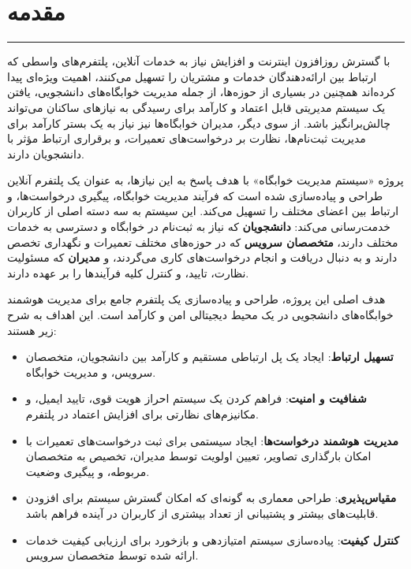 \documentclass[12pt,a4paper]{report}
\begin{document}
	
	
	
	\tableofcontents
	\newpage
	
	\listoffigures
	\newpage
	
	
	
	\chapter{مقدمه}
	\vspace{-2.5\baselineskip}
	\noindent\rule{\textwidth}{0.4pt}
	
	
	\hspace{-0.1cm} 
	با گسترش روزافزون اینترنت و افزایش نیاز به خدمات آنلاین، پلتفرم‌های واسطی که ارتباط بین ارائه‌دهندگان خدمات و مشتریان را تسهیل می‌کنند، اهمیت ویژه‌ای پیدا کرده‌اند همچنین در بسیاری از حوزه‌ها، از جمله مدیریت خوابگاه‌های دانشجویی، یافتن یک سیستم مدیریتی قابل اعتماد و کارآمد برای رسیدگی به نیازهای ساکنان می‌تواند چالش‌برانگیز باشد. از سوی دیگر، مدیران خوابگاه‌ها نیز نیاز به یک بستر کارآمد برای مدیریت ثبت‌نام‌ها، نظارت بر درخواست‌های تعمیرات، و برقراری ارتباط مؤثر با دانشجویان دارند.
	
	پروژه «سیستم مدیریت خوابگاه» با هدف پاسخ به این نیازها، به عنوان یک پلتفرم آنلاین طراحی و پیاده‌سازی شده است که فرآیند مدیریت خوابگاه، پیگیری درخواست‌ها، و ارتباط بین اعضای مختلف را تسهیل می‌کند. این سیستم به سه دسته اصلی از کاربران خدمت‌رسانی می‌کند: \textbf{دانشجویان} که نیاز به ثبت‌نام در خوابگاه و دسترسی به خدمات مختلف دارند، \textbf{متخصصان سرویس} که در حوزه‌های مختلف تعمیرات و نگهداری تخصص دارند و به دنبال دریافت و انجام درخواست‌های کاری می‌گردند، و \textbf{مدیران} که مسئولیت نظارت، تایید، و کنترل کلیه فرآیندها را بر عهده دارند.
	
	هدف اصلی این پروژه، طراحی و پیاده‌سازی یک پلتفرم جامع برای مدیریت هوشمند خوابگاه‌های دانشجویی در یک محیط دیجیتالی امن و کارآمد است. این اهداف به شرح زیر هستند:
	
	\begin{itemize}
		\item \textbf{تسهیل ارتباط}: ایجاد یک پل ارتباطی مستقیم و کارآمد بین دانشجویان، متخصصان سرویس، و مدیریت خوابگاه.
		
		\item \textbf{شفافیت و امنیت}: فراهم کردن یک سیستم احراز هویت قوی، تایید ایمیل، و مکانیزم‌های نظارتی برای افزایش اعتماد در پلتفرم.
		
		\item \textbf{مدیریت هوشمند درخواست‌ها}: ایجاد سیستمی برای ثبت درخواست‌های تعمیرات با امکان بارگذاری تصاویر، تعیین اولویت توسط مدیران، تخصیص به متخصصان مربوطه، و پیگیری وضعیت.
		
		\item \textbf{مقیاس‌پذیری}: طراحی معماری به گونه‌ای که امکان گسترش سیستم برای افزودن قابلیت‌های بیشتر و پشتیبانی از تعداد بیشتری از کاربران در آینده فراهم باشد.
		
		
		\item \textbf{کنترل کیفیت}: پیاده‌سازی سیستم امتیازدهی و بازخورد برای ارزیابی کیفیت خدمات ارائه شده توسط متخصصان سرویس.
	\end{itemize}
	
\end{document}
